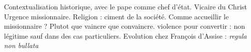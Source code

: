 \begin{Synthesis}
Contextualisation historique, avec le pape comme chef d'état. Vicaire du Christ
Urgence missionnaire.
Religion : ciment de la société. Comme accueillir le missionnaire ?
Plutot que vaincre que convaincre. 
violence pour convertir : non légitime sauf dans des cas particuliers. 
Evolution chez François d'Assise  : \textit{regula non bullata}

\end{Synthesis}
